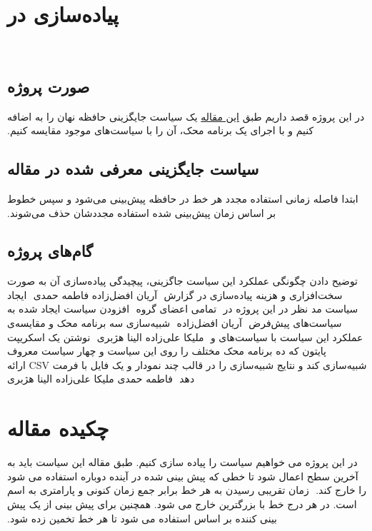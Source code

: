 ‫\section*{پیاده‌سازی  در }
‫\subsection*{صورت پروژه}
‫در این پروژه قصد داریم طبق \href{https://www.cs.utexas.edu/~lin/papers/hpca22.pdf}{این مقاله} یک سیاست جایگزینی حافظه نهان را به  اضافه کنیم و با اجرای یک برنامه محک، آن را با سیاست‌های موجود مقایسه کنیم.
‫\subsection*{سیاست جایگزینی معرفی شده در مقاله}
‫ابتدا فاصله زمانی استفاده مجدد هر خط در حافظه پیش‌بینی می‌شود و سپس خطوط بر اساس زمان پیش‌بینی شده استفاده مجددشان حذف می‌شوند.
‫\subsection*{گام‌های پروژه}
‫
‫ توضیح دادن چگونگی عملکرد این سیاست جاگزینی، پیچیدگی پیاده‌سازی آن به صورت سخت‌افزاری و هزینه پیاده‌سازی در گزارش
‫
‫ آریان افضل‌زاده
‫ فاطمه حمدی
‫
‫ ایجاد سیاست مد نظر در این پروژه در 
‫
‫ تمامی اعضای گروه
‫
‫ افزودن سیاست ایجاد شده به سیاست‌های پیش‌فرض 
‫
‫ آریان افضل‌زاده
‫
‫ شبیه‌سازی سه برنامه محک و مقایسه‌ی عملکرد این سیاست با سیاست‌های  و 
‫
‫ ملیکا علی‌زاده
‫ الینا هژبری
‫
‫ نوشتن یک اسکریپت پایتون که ده برنامه محک مختلف را روی این سیاست و چهار سیاست معروف شبیه‌سازی کند و نتایج شبیه‌سازی را در قالب چند نمودار و یک فایل با فرمت CSV ارائه دهد
‫
‫ فاطمه حمدی
‫ ملیکا علی‌زاده
‫ الینا هژبری
‫
‫
‫\newpage
‫\section*{چکیده مقاله}
‫در این پروژه می خواهیم سیاست  را پیاده سازی کنیم. طبق مقاله این سیاست باید به آخرین سطح  اعمال شود تا خطی که پیش بینی شده در آینده دوباره استفاده می شود را خارج کند.
‫ زمان تقریبی رسیدن به هر خط  برابر جمع زمان کنونی و پارامتری به اسم  است. در هر درج خط با بزرگترین  خارج می شود. همچنین برای پیش بینی  از یک پیش بینی کننده بر اساس  استفاده می شود تا  هر خط  تخمین زده شود.
